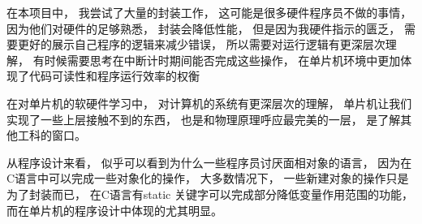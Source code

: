 \documentclass[../main.tex]{subfiles} %
\begin{document}
在本项目中，
我尝试了大量的封装工作，
这可能是很多硬件程序员不做的事情，
因为他们对硬件的足够熟悉，
封装会降低性能，
但是因为我硬件指示的匮乏，
需要更好的展示自己程序的逻辑来减少错误，
所以需要对运行逻辑有更深层次理解，
有时候需要思考在中断计时期间能否完成这些操作，
在单片机环境中更加体现了代码可读性和程序运行效率的权衡

在对单片机的软硬件学习中，
对计算机的系统有更深层次的理解，
单片机让我们实现了一些上层接触不到的东西，
也是和物理原理呼应最完美的一层，
是了解其他工科的窗口。

从程序设计来看，
似乎可以看到为什么一些程序员讨厌面相对象的语言，
因为在C语言中可以完成一些对象化的操作，
大多数情况下，
一些新建对象的操作只是为了封装而已，
在C语言有static 关键字可以完成部分降低变量作用范围的功能，
而在单片机的程序设计中体现的尤其明显。
\end{document}
